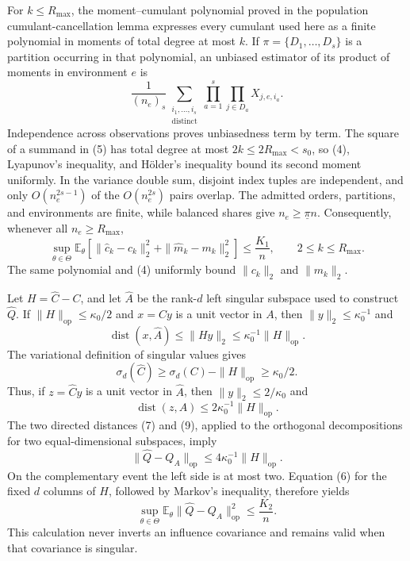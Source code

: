For \(k\leq R_{\max}\), the moment--cumulant polynomial proved in the population cumulant-cancellation lemma expresses every cumulant used here as a finite polynomial in moments of total degree at most \(k\).  If \(\pi=\{D_1,\ldots,D_s\}\) is a partition occurring in that polynomial, an unbiased estimator of its product of moments in environment \(e\) is
\[
 \frac1{(n_e)_s}
 \sum_{\substack{i_1,\ldots,i_s\\\text{distinct}}}
 \prod_{a=1}^s\prod_{j\in D_a}X_{j,e,i_a}.                               \tag{5}
\]
Independence across observations proves unbiasedness term by term.  The square of a summand in (5) has total degree at most \(2k\leq2R_{\max}<s_0\), so (4), Lyapunov's inequality, and H\"older's inequality bound its second moment uniformly.  In the variance double sum, disjoint index tuples are independent, and only \(O(n_e^{2s-1})\) of the \(O(n_e^{2s})\) pairs overlap.  The admitted orders, partitions, and environments are finite, while balanced shares give \(n_e\geq\underline\pi n\).  Consequently, whenever all \(n_e\geq R_{\max}\),
\[
 \sup_{\theta\in\Theta}
 \mathbb E_\theta\left[
  \|\widehat c_k-c_k\|_2^2+\|\widehat m_k-m_k\|_2^2
 \right]\leq\frac{K_1}{n},
 \qquad 2\leq k\leq R_{\max}.                                           \tag{6}
\]
The same polynomial and (4) uniformly bound \(\|c_k\|_2\) and \(\|m_k\|_2\).

Let \(H=\widehat C-C\), and let \(\widehat A\) be the rank-\(d\) left singular subspace used to construct \(\widehat Q\).  If \(\|H\|_{\mathrm{op}}\leq\kappa_0/2\) and \(x=Cy\) is a unit vector in \(A\), then \(\|y\|_2\leq\kappa_0^{-1}\) and
\[
 \operatorname{dist}(x,\widehat A)
 \leq\|Hy\|_2\leq\kappa_0^{-1}\|H\|_{\mathrm{op}}.                    \tag{7}
\]
The variational definition of singular values gives
\[
 \sigma_d(\widehat C)\geq\sigma_d(C)-\|H\|_{\mathrm{op}}
 \geq\kappa_0/2.                                                          \tag{8}
\]
Thus, if \(z=\widehat Cy\) is a unit vector in \(\widehat A\), then \(\|y\|_2\leq2/\kappa_0\) and
\[
 \operatorname{dist}(z,A)\leq2\kappa_0^{-1}\|H\|_{\mathrm{op}}.         \tag{9}
\]
The two directed distances (7) and (9), applied to the orthogonal decompositions for two equal-dimensional subspaces, imply
\[
 \|\widehat Q-Q_A\|_{\mathrm{op}}
 \leq4\kappa_0^{-1}\|H\|_{\mathrm{op}}.                                \tag{10}
\]
On the complementary event the left side is at most two.  Equation (6) for the fixed \(d\) columns of \(H\), followed by Markov's inequality, therefore yields
\[
 \sup_{\theta\in\Theta}
 \mathbb E_\theta\|\widehat Q-Q_A\|_{\mathrm{op}}^2\leq\frac{K_2}{n}. \tag{11}
\]
This calculation never inverts an influence covariance and remains valid when that covariance is singular.


